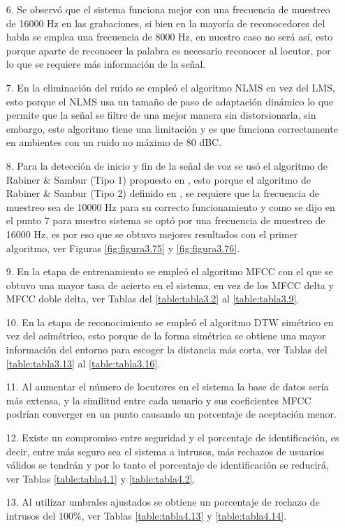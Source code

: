 \begin{enumerate}
\item[6.]Se observó que el sistema funciona mejor con una frecuencia de muestreo de 16000 Hz en las grabaciones, si bien en la mayoría de reconocedores del habla se emplea una frecuencia de 8000 Hz, en nuestro caso no será así, esto porque aparte de reconocer la palabra es necesario reconocer al locutor, por lo que se requiere más información de la señal.

\item[7.]En la eliminación del ruido se empleó el algoritmo NLMS en vez del LMS, esto porque el NLMS usa un tamaño de paso de adaptación dinámico lo que permite que la señal se filtre de una mejor manera sin distorsionarla, sin embargo, este algoritmo tiene una limitación y es que funciona correctamente en ambientes con un ruido no máximo de 80 dBC.
\newpage
\item[8.]Para la detección de inicio y fin de la señal de voz se usó el algoritmo de Rabiner \& Sambur (Tipo 1) propuesto en \citep{unam}, esto porque el algoritmo de Rabiner \& Sambur (Tipo 2) definido en \citep{rabiner}, se requiere que la frecuencia de muestreo sea de 10000 Hz para su correcto funcionamiento y como se dijo en el punto 7 para nuestro sistema se optó por una frecuencia de muestreo de 16000 Hz, es por eso que se obtuvo mejores resultados con el primer algoritmo, ver Figuras \ref{fig:figura3.75} y \ref{fig:figura3.76}.

\item[9.]En la etapa de entrenamiento se empleó el algoritmo MFCC con el que se obtuvo una mayor tasa de acierto en el sistema, en vez de los MFCC delta y MFCC doble delta, ver Tablas del \ref{table:tabla3.2} al \ref{table:tabla3.9}.

\item[10.]En la etapa de reconocimiento se empleó el algoritmo DTW simétrico en vez del asimétrico, esto porque de la forma simétrica se obtiene una mayor información del entorno para escoger la distancia más corta, ver Tablas del \ref{table:tabla3.13} al \ref{table:tabla3.16}.

\item[11.]Al aumentar el número de locutores en el sistema la base de datos sería más extensa, y la similitud entre cada usuario y sus coeficientes MFCC podrían converger en un punto causando un porcentaje de aceptación menor.

\item[12.]Existe un compromiso entre seguridad y el porcentaje de identificación, es decir, entre más seguro sea el sistema a intrusos, más rechazos de usuarios válidos se tendrán y por lo tanto el porcentaje de identificación se reducirá, ver Tablas \ref{table:tabla4.1} y \ref{table:tabla4.2}.

\item[13.]Al utilizar umbrales ajustados se obtiene un porcentaje de rechazo de intrusos del 100\%, ver Tablas \ref{table:tabla4.13} y \ref{table:tabla4.14}.
\end{enumerate}

